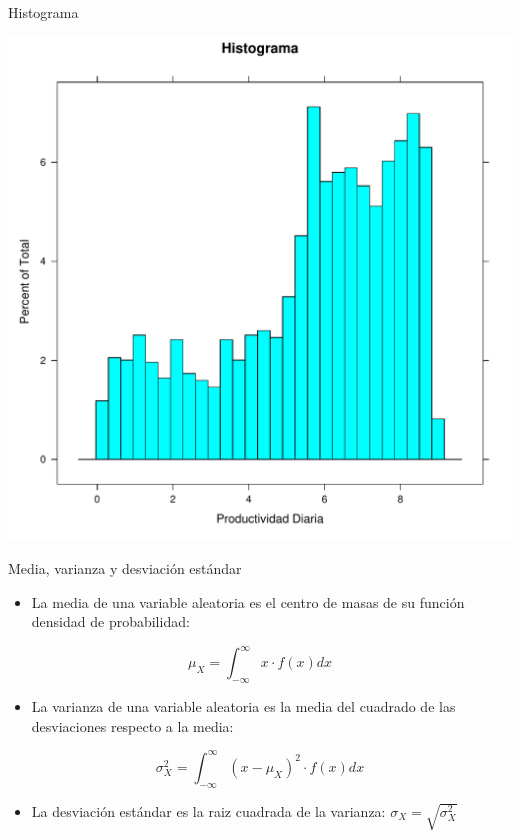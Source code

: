 \documentclass[xcolor={usenames,svgnames,dvipsnames}]{beamer}
\begin{document}
\begin{frame}[label={sec:orgaa6eff1}]{Histograma}
\begin{center}
\includegraphics[width=.9\linewidth]{../figs/Histograma.pdf}
\end{center}
\end{frame}



\begin{frame}[label={sec:org823a449}]{Media, varianza y desviación estándar}
\begin{itemize}
\item La \alert{media} de una variable aleatoria es el \alert{centro de masas} de su función densidad de probabilidad:
\end{itemize}

\[
\mu_{X}=\int_{-\infty}^{\infty}x\cdot f(x)dx
\]

\begin{itemize}
\item La \alert{varianza} de una variable aleatoria es la \alert{media del cuadrado de las desviaciones} respecto a la media:
\end{itemize}

\[
\sigma_{X}^{2}=\int_{-\infty}^{\infty}(x-\mu_{X})^{2}\cdot f(x)dx
\]

\begin{itemize}
\item La \alert{desviación estándar} es la raiz cuadrada de la varianza: \(\sigma_{X}=\sqrt{\sigma_{X}^2}\)
\end{itemize}
\end{frame}
\end{document}

